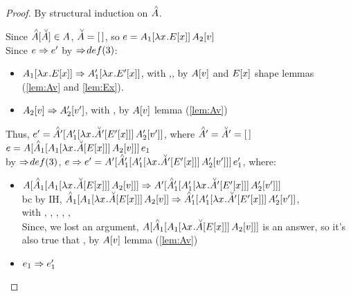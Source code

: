\documentclass{article}
\begin{document}
\begin{proof}
  By structural induction on $\Ap$.
  \begin{byCases}
    \case{\Ap = \hole}
    Since $\inAp{\Am} \in \A$, $\Am = \hole$, so
    $\e   = \ap{\inA[_1]{\lx\Ex}}{\Av[_2]}$ \\
    Since $\e \pstep \e'$ by $\pstep\!def(3)$:
    \begin{itemize}
      \item $\inA[_1]{\lx\Ex} \pstep \inA[_1']{\lx\Ex[']}$, 
        with ,\IH{\E},
        by $\Av$ and $\Ex$ shape lemmas (\ref{lem:Av} and \ref{lem:Ex}).
      \item $\Av[_2] \pstep \inA[_2']{\val'}$, with ,\IH{\val}
        by $\Av$ lemma (\ref{lem:Av})
    \end{itemize}
    Thus, $e'= \inAp[']{\ap{\inA[_1']{\lx\inAm[']{\Ex[']}}}{\inA[_2']{\val'}}}$,
    where $\Ap' = \Am' = \hole$
    $\e = \ap{\inA{\inAp[_1]{\ap{\inA[_1]{\lx\inAm{\Ex}}}{\Av[_2]}}}}{\e_1}$ \\
    by $\pstep\!def(3)$,
    $\e \pstep \e' = \ap{\inA[']{\inAp[_1']{\ap{\inA[_1']{\lx\inAm[']{\Ex[']}}}
                                               {\inA[_2']{\val'}}}}}{\e_1'}$,
    where:
    \begin{itemize}
      \item $\inA{\inAp[_1]{\ap{\inA[_1]{\lx\inAm{\Ex}}}
                                   {\inA[_2]{\val}}}}
                   \pstep
             \inA[']{\inAp[_1']{\ap{\inA[_1']{\lx\inAm[']{\Ex[']}}}
                                   {\inA[_2']{\val'}}}}$\\
       bc by IH,
       $\inAp[_1]{\ap{\inA[_1]{\lx\inAm{\Ex}}}{\inA[_2]{\val}}}
           \pstep
        \inAp[_1']{\ap{\inA[_1']{\lx\inAm[']{\Ex[']}}}{\inA[_2']{\val'}}}$,\\
        with , , \IH{\Am}, \IH{\E}, , \IH{\val}\\
        Since, we lost an argument,
        $\inA{\inAp[_1]{\ap{\inA[_1]{\lx\inAm{\Ex}}}{\inA[_2]{\val}}}}$ 
        is an answer, so it's also true that \IH{\A}, 
        by $\Av$ lemma (\ref{lem:Av})
      \item $\e_1 \pstep \e_1'$
    \end{itemize}

  \end{byCases}
\end{proof}
\end{document}
